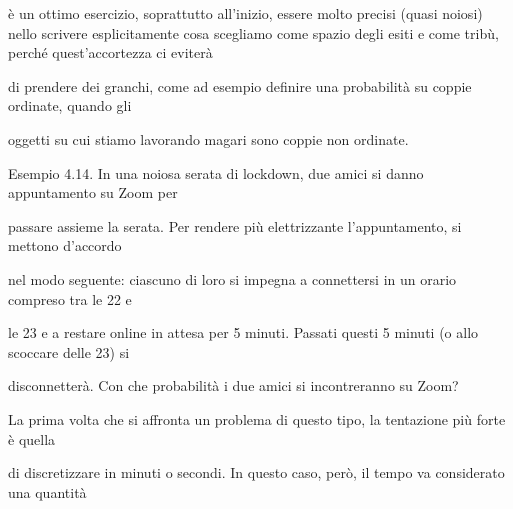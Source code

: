 \documentclass[a4paper,portrait,12pt]{article}
\begin{document}
\begin{flushleft}
\`{e} un ottimo esercizio, soprattutto all'inizio, essere molto precisi (quasi noiosi) nello scrivere esplicitamente cosa scegliamo come spazio degli esiti e come tribù, perch\'{e} quest'accortezza ci eviter\`{a}
\end{flushleft}


\begin{flushleft}
di prendere dei granchi, come ad esempio definire una probabilit\`{a} su coppie ordinate, quando gli
\end{flushleft}


\begin{flushleft}
oggetti su cui stiamo lavorando magari sono coppie non ordinate.
\end{flushleft}


\begin{flushleft}
Esempio 4.14. In una noiosa serata di lockdown, due amici si danno appuntamento su Zoom per
\end{flushleft}


\begin{flushleft}
passare assieme la serata. Per rendere più elettrizzante l'appuntamento, si mettono d'accordo
\end{flushleft}


\begin{flushleft}
nel modo seguente: ciascuno di loro si impegna a connettersi in un orario compreso tra le 22 e
\end{flushleft}


\begin{flushleft}
le 23 e a restare online in attesa per 5 minuti. Passati questi 5 minuti (o allo scoccare delle 23) si
\end{flushleft}


\begin{flushleft}
disconnetter\`{a}. Con che probabilit\`{a} i due amici si incontreranno su Zoom?
\end{flushleft}


\begin{flushleft}
La prima volta che si affronta un problema di questo tipo, la tentazione più forte \`{e} quella
\end{flushleft}


\begin{flushleft}
di discretizzare in minuti o secondi. In questo caso, per\`{o}, il tempo va considerato una quantit\`{a}
\end{flushleft}
\end{document}
